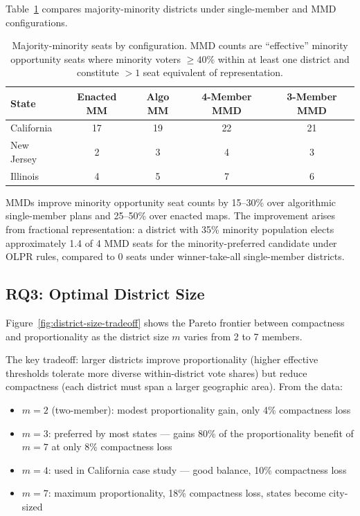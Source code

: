 Table~\ref{tab:mmid-minority} compares majority-minority districts under single-member and MMD configurations.

\begin{table}[h]
\centering\small
\caption{Majority-minority seats by configuration. MMD counts are ``effective'' minority opportunity seats where minority voters $\geq 40\%$ within at least one district and constitute $> 1$ seat equivalent of representation.}
\label{tab:mmid-minority}
\begin{tabular}{lcccc}
\toprule
State & Enacted MM & Algo MM & 4-Member MMD & 3-Member MMD \\
\midrule
California  & 17 & 19 & 22 & 21 \\
New Jersey  &  2 &  3 &  4 &  3 \\
Illinois    &  4 &  5 &  7 &  6 \\
\bottomrule
\end{tabular}
\end{table}

MMDs improve minority opportunity seat counts by 15--30\% over algorithmic single-member plans and 25--50\% over enacted maps. The improvement arises from fractional representation: a district with 35\% minority population elects approximately 1.4 of 4 MMD seats for the minority-preferred candidate under OLPR rules, compared to 0 seats under winner-take-all single-member districts.

\subsection{RQ3: Optimal District Size}

Figure~\ref{fig:district-size-tradeoff} shows the Pareto frontier between compactness and proportionality as the district size $m$ varies from 2 to 7 members.

The key tradeoff: larger districts improve proportionality (higher effective thresholds tolerate more diverse within-district vote shares) but reduce compactness (each district must span a larger geographic area). From the data:

\begin{itemize}
  \item $m=2$ (two-member): modest proportionality gain, only 4\% compactness loss
  \item $m=3$: preferred by most states — gains 80\% of the proportionality benefit of $m=7$ at only 8\% compactness loss
  \item $m=4$: used in California case study — good balance, 10\% compactness loss
  \item $m=7$: maximum proportionality, 18\% compactness loss, states become city-sized
\end{itemize}


